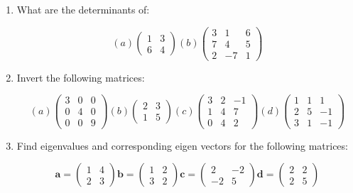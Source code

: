 \begin{enumerate}
\item What are the determinants of:

\begin{displaymath}
(a) \left( \begin{array}{rr} 1 & 3 \\ 6 & 4 \end{array} \right)
(b) \left( \begin{array}{rrr} 3 & 1 & 6 \\ 7 & 4 & 5 \\ 2 & -7 & 1 \end{array} \right)
\end{displaymath}

\item Invert the following matrices:

\begin{displaymath}
(a) \left( \begin{array}{rrr} 3 & 0 & 0 \\ 0 & 4 & 0 \\ 0 & 0 & 9 \end{array} \right)
(b) \left( \begin{array}{rr} 2 & 3 \\ 1 & 5  \end{array} \right)
(c) \left( \begin{array}{rrr} 3 & 2 & -1 \\ 1 & 4 & 7 \\ 0 & 4 & 2 \end{array} \right)
(d) \left( \begin{array}{rrr} 1 & 1 & 1 \\ 2 & 5 & -1 \\ 3 & 1 & -1 \end{array} \right)
\end{displaymath}


\item Find eigenvalues and corresponding eigen vectors for the following matrices:


\begin{displaymath}
\boldsymbol{a} = \left( \begin{array}{rr} 1 & 4\\ 2 & 3 \end{array} \right)
\boldsymbol{b} = \left( \begin{array}{rr} 1 & 2 \\ 3 & 2  \end{array} \right)
\boldsymbol{c} = \left( \begin{array}{rr} 2 & -2 \\ -2 & 5 \end{array} \right)
\boldsymbol{d} = \left( \begin{array}{rr} 2 & 2 \\ 2 & 5 \end{array} \right)
\end{displaymath}


\end{enumerate}
